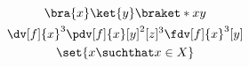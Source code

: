 \documentclass{article}
\begin{document}
\begin{gather}
  \bra{x}\ket{y}
  \braket*{x}{y}\\
  \dv[f]{x}^3
  \pdv[f]{x}[y]^2[z]^3
  \fdv[f]{x}^3[y]\\
  \set{x \suchthat x \in X}
\end{gather}
\end{document}
